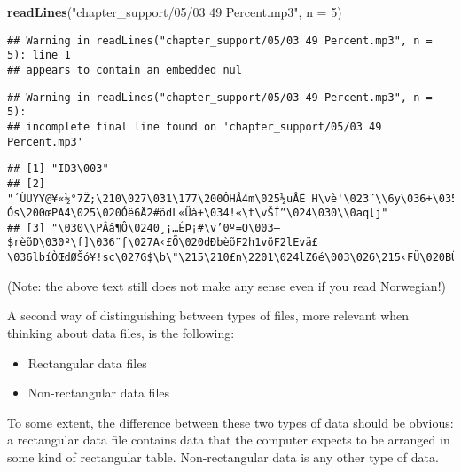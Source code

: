 \documentclass[]{book}
\newenvironment{Shaded}{\begin{snugshade}}{\end{snugshade}}
\newcommand{\KeywordTok}[1]{\textcolor[rgb]{0.13,0.29,0.53}{\textbf{#1}}}
\newcommand{\DataTypeTok}[1]{\textcolor[rgb]{0.13,0.29,0.53}{#1}}
\newcommand{\DecValTok}[1]{\textcolor[rgb]{0.00,0.00,0.81}{#1}}
\newcommand{\StringTok}[1]{\textcolor[rgb]{0.31,0.60,0.02}{#1}}
\newcommand{\NormalTok}[1]{#1}
\providecommand{\tightlist}{%
  \setlength{\itemsep}{0pt}\setlength{\parskip}{0pt}}
\theoremstyle{definition}
\theoremstyle{definition}
\theoremstyle{definition}
\theoremstyle{remark}
\begin{document}
\begin{Shaded}
\begin{Highlighting}[]
\KeywordTok{readLines}\NormalTok{(}\StringTok{"chapter_support/05/03 49 Percent.mp3"}\NormalTok{, }\DataTypeTok{n =} \DecValTok{5}\NormalTok{)}
\end{Highlighting}
\end{Shaded}

\begin{verbatim}
## Warning in readLines("chapter_support/05/03 49 Percent.mp3", n = 5): line 1
## appears to contain an embedded nul
\end{verbatim}

\begin{verbatim}
## Warning in readLines("chapter_support/05/03 49 Percent.mp3", n = 5):
## incomplete final line found on 'chapter_support/05/03 49 Percent.mp3'
\end{verbatim}

\begin{verbatim}
## [1] "ID3\003"                                                                                                                                                                  
## [2] "´ÙUYY@¥«½°7Ž;\210\027\031\177\200ÔHÅ4m\025½uÅË H\vè'\023¨\\6y\036+\035\026Ã!|Ós\200œPA4\025\020Óê6Ä2#õdL«Üà+\034!«\t\vŠÍ”\024\030\\0aq[j"                                           
## [3] "\030\\PÂâ¶Ô\0240¸¡…ÉÞ¡#\v’0º=Q\003—$rèõD\030º\f]\036¨ƒ\027A‹£Õ\020dÐbèõF2h1võF2lEvä£\036lbíÒŒdØŠó¥!sc\027G$\b\"\215\210£n\2201\024lZ6é\003\026\215‹FÜ\020BÛ`\\qÂãOèYðÁ5¿$Nï”/\020\027"
\end{verbatim}

(Note: the above text still does not make any sense even if you read
Norwegian!)

A second way of distinguishing between types of files, more relevant
when thinking about data files, is the following:

\begin{itemize}
\tightlist
\item
  Rectangular data files
\item
  Non-rectangular data files
\end{itemize}

To some extent, the difference between these two types of data should be
obvious: a rectangular data file contains data that the computer expects
to be arranged in some kind of rectangular table. Non-rectangular data
is any other type of data.
\end{document}

